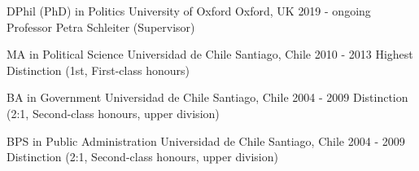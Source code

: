 





\begin{cventries}

\vspace{0.5mm}
\cventry
{DPhil (PhD) in Politics} 
{University of Oxford} 
{Oxford, UK} 
{2019 - ongoing} 
{Professor Petra Schleiter (Supervisor)} \vspace{1.5mm}

\cventry
{MA in Political Science} 
{Universidad de Chile} 
{Santiago, Chile} 
{2010 - 2013} 
{Highest Distinction (1st, First-class honours)} \vspace{1.5mm}

\cventry
{BA in Government} 
{Universidad de Chile} 
{Santiago, Chile} 
{2004 - 2009} 
{Distinction (2:1, Second-class honours, upper division)} \vspace{1.5mm}

\cventry
{BPS in Public Administration} 
{Universidad de Chile} 
{Santiago, Chile} 
{2004 - 2009} 
{Distinction (2:1, Second-class honours, upper division)}\vspace{1.5mm}

\end{cventries}
